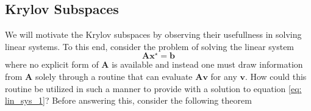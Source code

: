 
\subsection{Krylov Subspaces}\label{Section4.1}

We will motivate the Krylov subspaces by observing their usefullness in solving linear systems. To this end, consider the problem of solving the linear system
\begin{equation}\label{eq: lin_sys_1}
    \bm{A} \bm{x^{\star}} = \bm{b}
\end{equation}
where no explicit form of $\bm{A}$ is available and instead one must draw information from $\bm{A}$ solely through a routine that can evaluate $\bm{A} \bm{v}$ for any $\bm{v}$. How could this routine be utilized in such a manner to provide with a solution to equation \ref{eq: lin_sys_1}? Before answering this, consider the following theorem

